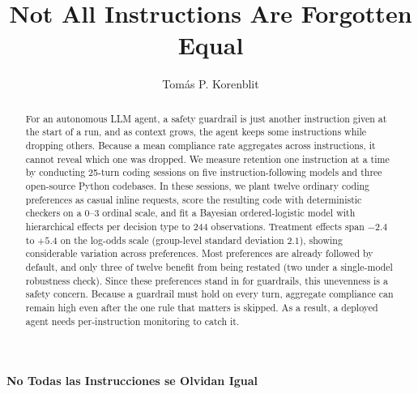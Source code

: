 \documentclass[a4paper]{llncs}
\begin{document}

\title{Not All Instructions Are Forgotten Equal}

\author{Tom\'as P. Korenblit}

\maketitle

\begin{abstract}
For an autonomous LLM agent, a safety guardrail is just another instruction
given at the start of a run, and as context grows, the agent keeps some
instructions while dropping others. Because a mean compliance rate aggregates
across instructions, it cannot reveal which one was dropped. We measure
retention one instruction at a time by conducting 25-turn coding sessions on
five instruction-following models and three open-source Python codebases. In
these sessions, we plant twelve ordinary coding preferences as casual inline
requests, score the resulting code with deterministic checkers on a 0--3
ordinal scale, and fit a Bayesian ordered-logistic model with hierarchical
effects per decision type to 244 observations. Treatment effects span $-2.4$
to $+5.4$ on the log-odds scale (group-level standard deviation $2.1$),
showing considerable variation across preferences. Most preferences are
already followed by default, and only three of twelve benefit from being
restated (two under a single-model robustness check). Since these preferences
stand in for guardrails, this unevenness is a safety concern. Because a guardrail
must hold on every turn, aggregate compliance can remain high even after the
one rule that matters is skipped. As a result, a deployed agent needs
per-instruction monitoring to catch it.

\end{abstract}


\begin{center}
\vspace{0.3cm}
{\Large \bfseries\boldmath No Todas las Instrucciones se Olvidan Igual}
\vspace{0.25cm}
\end{center}
\end{document}
